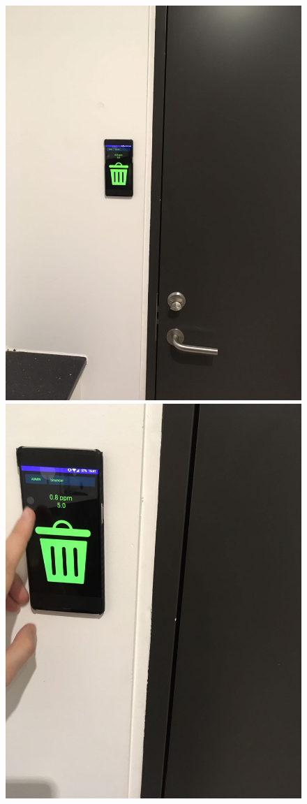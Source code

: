 \begin{figure}
\centering
\includegraphics[scale=.05]{img/IMG-20161130-WA0000}
\includegraphics[scale=.05]{img/IMG-20161130-WA0004}

\end{figure}
